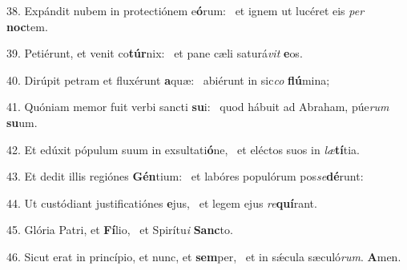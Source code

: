 38. Expándit nubem in protectiónem e\textbf{ó}rum: \ast\  et ignem ut lucéret eis \textit{per} \textbf{noc}tem.\

39. Petiérunt, et venit co\textbf{túr}nix: \ast\  et pane cæli saturá\textit{vit} \textbf{e}os.\

40. Dirúpit petram et fluxérunt \textbf{a}quæ: \ast\  abiérunt in sic\textit{co} \textbf{flú}mina;\

41. Quóniam memor fuit verbi sancti \textbf{su}i: \ast\  quod hábuit ad Abraham, púe\textit{rum} \textbf{su}um.\

42. Et edúxit pópulum suum in exsultati\textbf{ó}ne, \ast\  et eléctos suos in \textit{læ}\textbf{tí}tia.\

43. Et dedit illis regiónes \textbf{Gén}tium: \ast\  et labóres populórum pos\textit{se}\textbf{dé}runt:\

44. Ut custódiant justificatiónes \textbf{e}jus, \ast\  et legem ejus \textit{re}\textbf{quí}rant.\

45. Glória Patri, et \textbf{Fí}lio, \ast\  et Spirítu\textit{i} \textbf{Sanc}to.\

46. Sicut erat in princípio, et nunc, et \textbf{sem}per, \ast\  et in sǽcula sæculó\textit{rum}. \textbf{A}men.\


